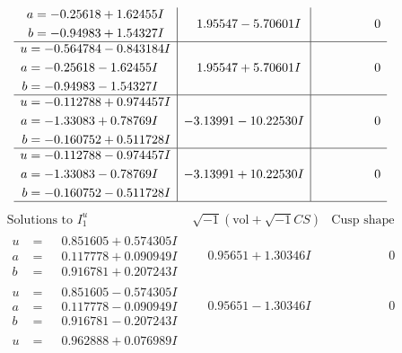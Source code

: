 \documentclass[1p]{elsarticle_modified}
\theoremstyle{definition}
\newcommand{\I}{\sqrt{-1}}
\begin{document}
$$\begin{array}{c|c|c}
\begin{aligned}
a &= -0.25618 + 1.62455 I \\
b &= -0.94983 + 1.54327 I\end{aligned}
 & \phantom{-}1.95547 - 5.70601 I & \phantom{-0.000000 } 0 \\ \hline\begin{aligned}
u &= -0.564784 - 0.843184 I \\
a &= -0.25618 - 1.62455 I \\
b &= -0.94983 - 1.54327 I\end{aligned}
 & \phantom{-}1.95547 + 5.70601 I & \phantom{-0.000000 } 0 \\ \hline\begin{aligned}
u &= -0.112788 + 0.974457 I \\
a &= -1.33083 + 0.78769 I \\
b &= -0.160752 + 0.511728 I\end{aligned}
 & -3.13991 - 10.22530 I & \phantom{-0.000000 } 0 \\ \hline\begin{aligned}
u &= -0.112788 - 0.974457 I \\
a &= -1.33083 - 0.78769 I \\
b &= -0.160752 - 0.511728 I\end{aligned}
 & -3.13991 + 10.22530 I & \phantom{-0.000000 } 0\\
 \hline 
 \end{array}$$\newpage$$\begin{array}{c|c|c}  
\text{Solutions to }I^u_{1}& \I (\text{vol} + \sqrt{-1}CS) & \text{Cusp shape}\\
 \hline 
\begin{aligned}
u &= \phantom{-}0.851605 + 0.574305 I \\
a &= \phantom{-}0.117778 + 0.090949 I \\
b &= \phantom{-}0.916781 + 0.207243 I\end{aligned}
 & \phantom{-}0.95651 + 1.30346 I & \phantom{-0.000000 } 0 \\ \hline\begin{aligned}
u &= \phantom{-}0.851605 - 0.574305 I \\
a &= \phantom{-}0.117778 - 0.090949 I \\
b &= \phantom{-}0.916781 - 0.207243 I\end{aligned}
 & \phantom{-}0.95651 - 1.30346 I & \phantom{-0.000000 } 0 \\ \hline\begin{aligned}
u &= \phantom{-}0.962888 + 0.076989 I \\

\end{aligned}
\end{array}$$
\end{document}
